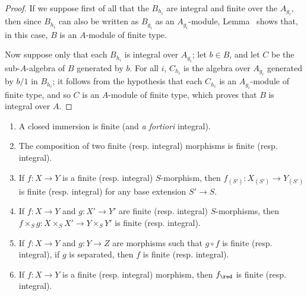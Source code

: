 \begin{proof}
If we suppose first of all that the $B_{h_i}$ are integral and finite over the $A_{g_i}$, then since $B_{h_i}$ can also be written as $B_{g_i}$ as an $A_{g_i}$-module, Lemma~ shows that, in this case, $B$ is an $A$-module of finite type.

Now suppose only that each $B_{h_i}$ is integral over $A_{g_i}$;
let $b\in B$, and let $C$ be the sub-$A$-algebra of $B$ generated by $b$.
For all $i$, $C_{h_i}$ is the algebra over $A_{g_i}$ generated by $b/1$ in $B_{h_i}$;
it follows from the hypothesis that each $C_{h_i}$ is an $A_{g_i}$-module of finite type, and so  $C$ is an $A$-module of finite type, which proves that $B$ is integral over $A$.
\end{proof}

\begin{proposition}[6.1.5]
\label{II.6.1.5}
\medskip\noindent
\begin{enumerate}
  \item[(i)] A closed immersion is finite (and \emph{a fortiori} integral).
  \item[(ii)] The composition of two finite (resp. integral) morphisms is finite (resp. integral).
  \item[(iii)] If $f:X\to Y$ is a finite (resp. integral) $S$-morphism, then $f_{(S')}:X_{(S')}\to Y_{(S')}$ is finite (resp. integral) for any base extension $S'\to S$.
  \item[(iv)] If $f:X\to Y$ and $g:X'\to Y'$ are finite (resp. integral) $S$-morphisms, then $f\times_S g:X\times_S X'\to Y\times_S Y'$ is finite (resp. integral).
  \item[(v)] If $f:X\to Y$ and $g:Y\to Z$ are morphisms such that $g\circ f$ is finite (resp. integral), if $g$ is separated, then $f$ is finite (resp. integral).
  \item[(vi)] If $f:X\to Y$ is a finite (resp. integral) morphism, then $f_\red$ is finite (resp. integral).
\end{enumerate}
\end{proposition}

